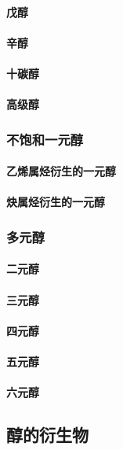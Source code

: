 \documentclass[UTF8]{../03-Chemistry}
\begin{document}
            \paragraph{戊醇}
            \paragraph{辛醇}
            \paragraph{十碳醇}
            \paragraph{高级醇}

        \subsubsection{不饱和一元醇}
            \paragraph{乙烯属烃衍生的一元醇}
            \paragraph{炔属烃衍生的一元醇}
        \subsubsection{多元醇}
            \paragraph{二元醇}
            \paragraph{三元醇}
            \paragraph{四元醇}
            \paragraph{五元醇}
            \paragraph{六元醇}

    \subsection{醇的衍生物}
\end{document}
